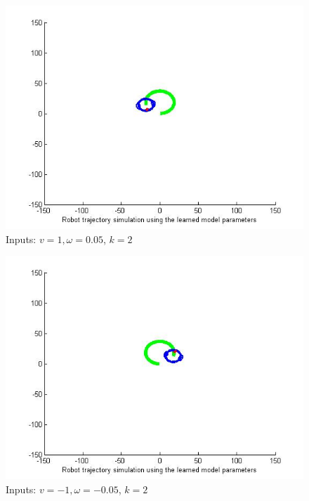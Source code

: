\documentclass[10pt,a4paper]{report}
\begin{document}
\begin{figure}[!ht]
	\graphicspath{{./Exercise1/}}
	\centering
	\includegraphics[scale=0.5]{k_2_fig_4}	
	
	\begin{flushleft}
	\caption{Inputs: $v=1,\omega=0.05$, $k=2$}
	\end{flushleft}
	\label{fig:fig_4}
	
\end{figure}

\begin{figure}[!ht]
	\graphicspath{{./Exercise1/}}
	\centering
	\includegraphics[scale=0.5]{k_2_fig_5}	
	
	\begin{flushleft}
	\caption{Inputs: $v=-1,\omega=-0.05$, $k=2$}
	\end{flushleft}
	\label{fig:fig_5}
	
\end{figure}
\end{document}
